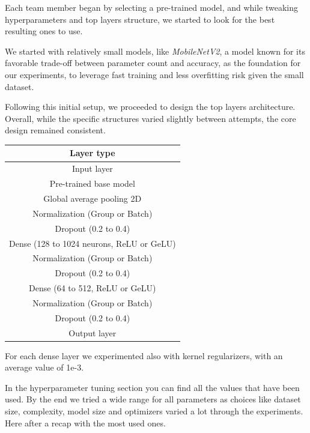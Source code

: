 \documentclass[11pt]{article}
\begin{document}
Each team member began by selecting a pre-trained model, and while tweaking hyperparameters and top layers structure, we started to look for the best resulting ones to use.

We started with relatively small models, like \textit{MobileNetV2}, a model known for its favorable trade-off between parameter count and accuracy, as the foundation for our experiments, to leverage fast training and less overfitting risk given the small dataset.

Following this initial setup, we proceeded to design the top layers architecture. 
Overall, while the specific structures varied slightly between attempts, the core design remained consistent.

\begin{table}[h!]
    \centering
    \begin{tabular}{|c|}
        \hline
        \textbf{Layer type} \\ \hline
        Input layer \\ \hline
        Pre-trained base model \\ \hline
        Global average pooling 2D \\ \hline
        Normalization (Group or Batch) \\ \hline
        Dropout (0.2 to 0.4) \\ \hline
        Dense (128 to 1024 neurons, ReLU or GeLU) \\ \hline
        Normalization (Group or Batch) \\ \hline
        Dropout (0.2 to 0.4) \\ \hline
        Dense (64 to 512, ReLU or GeLU) \\ \hline
        Normalization (Group or Batch) \\ \hline
        Dropout (0.2 to 0.4) \\ \hline
        Output layer \\ \hline
    \end{tabular}
\end{table}

For each dense layer we experimented also with kernel regularizers, with an average value of 1e-3.

In the hyperparameter tuning section you can find all the values that have been used. By the end we tried a wide range for all parameters as choices like dataset size, complexity, model size and optimizers varied a lot through the experiments.
Here after a recap with the most used ones.
\end{document}
